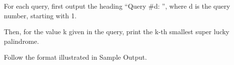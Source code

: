 For each query, first output the heading “Query \#d: ”, where d is the query number, starting with 1.

Then, for the value k given in the query, print the k-th smallest super lucky palindrome.

Follow the format illustrated in Sample Output.